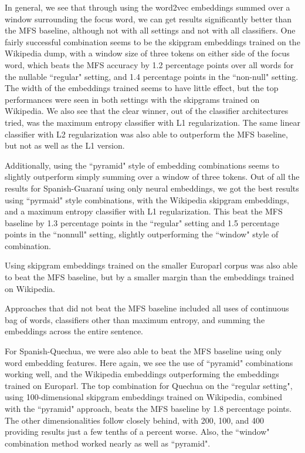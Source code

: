 In general, we see that through using the word2vec embeddings summed over a
window surrounding the focus word, we can get results significantly better than
the MFS baseline, although not with all settings and not with all classifiers.
One fairly successful combination seems to be the skipgram embeddings trained
on the Wikipedia dump, with a window size of three tokens on either side of the
focus word, which beats the MFS accuracy by 1.2 percentage points over all
words for the nullable ``regular" setting, and 1.4 percentage points in the
``non-null" setting. The width of the embeddings trained seems to have little
effect, but the top performances were seen in both settings with the skipgrams
trained on Wikipedia. We also see that the clear winner, out of the classifier
architectures tried, was the maximum entropy classifier with L1 regularization.
The same linear classifier with L2 regularization was also able to outperform
the MFS baseline, but not as well as the L1 version.

Additionally, using the ``pyramid" style of embedding combinations seems to
slightly outperform simply summing over a window of three tokens. Out of all
the results for Spanish-Guaraní using only neural embeddings, we got the best
results using ``pyrmaid" style combinations, with the Wikipedia skipgram
embeddings, and a maximum entropy classifier with L1 regularization. This beat
the MFS baseline by 1.3 percentage points in the ``regular" setting and 1.5
percentage points in the ``nonnull" setting, slightly outperforming the
``window" style of combination.

Using skipgram embeddings trained on the smaller Europarl corpus was also able
to beat the MFS baseline, but by a smaller margin than the embeddings trained
on Wikipedia.

Approaches that did not beat the MFS baseline included all uses of continuous
bag of words, classifiers other than maximum entropy, and summing the
embeddings across the entire sentence.

For Spanish-Quechua, we were also able to beat the MFS baseline using only word
embedding features. Here again, we see the use of ``pyramid" combinations
working well, and the Wikipedia embeddings outperforming the embeddings trained
on Europarl. The top combination for Quechua on the ``regular setting", using
100-dimensional skipgram embeddings trained on Wikipedia, combined with the
``pyramid" approach, beats the MFS baseline by 1.8 percentage points. The other
dimensionalities follow closely behind, with 200, 100, and 400 providing
results just a few tenths of a percent worse. Also, the ``window" combination
method worked nearly as well as ``pyramid".


